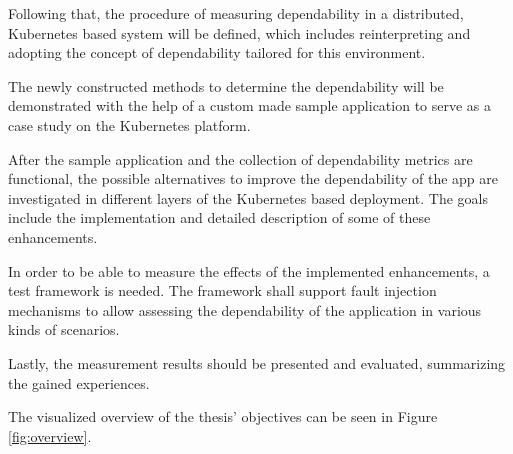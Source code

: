 Following that, the procedure of measuring dependability in a distributed, Kubernetes based system will be defined, which includes reinterpreting and adopting the concept of dependability tailored for this environment.

The newly constructed methods to determine the dependability will be demonstrated with the help of a custom made sample application to serve as a case study on the Kubernetes platform.

After the sample application and the collection of dependability metrics are functional, the possible alternatives to improve the dependability of the app are investigated in different layers of the Kubernetes based deployment. The goals include the implementation and detailed description of some of these enhancements.

In order to be able to measure the effects of the implemented enhancements, a test framework is needed. The framework shall support fault injection mechanisms to allow assessing the dependability of the application in various kinds of scenarios.

Lastly, the measurement results should be presented and evaluated, summarizing the gained experiences.

The visualized overview of the thesis' objectives can be seen in Figure \ref{fig:overview}.



